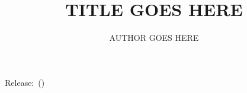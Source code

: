 \documentclass[11pt, a4paper, final]{article}
\title{TITLE GOES HERE}
\author{AUTHOR GOES HERE}
\date{\DTMenglishmonthname{\DTMfetchmonth{gitdate}} \DTMfetchyear{gitdate}}
\begin{document}
\maketitle
{\centering Release:\gitReln\ (\gitAbbrevHash)\\ }


\end{document}
